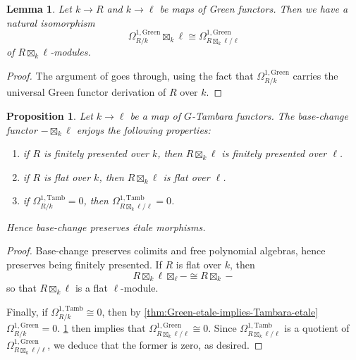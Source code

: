 \documentclass[11pt,dvipsnames]{amsart}
\newtheorem{lemma}[theorem]{Lemma}
\newtheorem{proposition}[theorem]{Proposition}
\theoremstyle{BoldRemark}
\newcommand{\Tamb}{\mathrm{Tamb}}
\newcommand{\Green}{\mathrm{Green}}
\begin{document}
\begin{lemma}\label{lem:base-change-for-Green-Kahler-differentials}
    Let $k \rightarrow R$ and $k \rightarrow \ell$ be maps of Green functors. Then we have a natural isomorphism 
    \[ 
        \Omega^{1,\Green}_{R/k} \boxtimes_k \ell \cong \Omega^{1,\Green}_{R \boxtimes_k \ell / \ell}
    \] 
    of $R \boxtimes_k \ell$-modules.
\end{lemma}

\begin{proof}
    The argument of \cite[Lemma 10.131.12]{stacks-project} goes through, using the fact that $\Omega^{1,\Green}_{R/k}$ carries the universal Green functor derivation of $R$ over $k$.
\end{proof}

\begin{proposition}\label{prop:base-change-of-etale-is-etale}
    Let $k \rightarrow \ell$ be a map of $G$-Tambara functors. The base-change functor $- \boxtimes_k \ell$ enjoys the following properties:
    \begin{enumerate}
        \item if $R$ is finitely presented over $k$, then $R \boxtimes_k \ell$ is finitely presented over $\ell$.
        \item if $R$ is flat over $k$, then $R \boxtimes_k \ell$ is flat over $\ell$.
        \item if $\Omega^{1,\Tamb}_{R/k} = 0$, then $\Omega^{1,\Tamb}_{R \boxtimes_k \ell/\ell} = 0$.
    \end{enumerate}
    Hence base-change preserves \'{e}tale morphisms.
\end{proposition}

\begin{proof}
    Base-change preserves colimits and free polynomial algebras, hence preserves being finitely presented. If $R$ is flat over $k$, then 
    \[ 
        R \boxtimes_k \ell \boxtimes_\ell - \cong R \boxtimes_k - 
    \] 
    so that $R \boxtimes_k \ell$ is a flat $\ell$-module. 
    
    Finally, if $\Omega^{1,\Tamb}_{R/k} \cong 0$, then by \cref{thm:Green-etale-implies-Tambara-etale} $\Omega^{1,\Green}_{R/k} = 0$. \cref{lem:base-change-for-Green-Kahler-differentials} then implies that $\Omega^{1,\Green}_{R \boxtimes_k \ell / \ell} \cong 0$. Since $\Omega^{1,\Tamb}_{R \boxtimes_k \ell / \ell}$ is a quotient of $\Omega^{1,\Green}_{R \boxtimes_k \ell / \ell}$, we deduce that the former is zero, as desired.
\end{proof}
\end{document}
